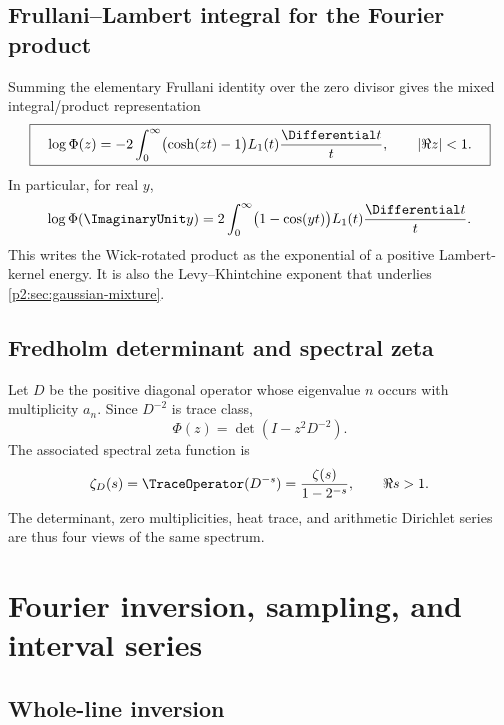 \documentclass[11pt]{article}
\theoremstyle{definition}
\theoremstyle{remark}
\begin{document}
\subsection{Frullani--Lambert integral for the Fourier product}

Summing the elementary Frullani identity over the zero divisor gives the mixed
integral/product representation
\begin{equation}
 \boxed{\quad
 \log\Phi(z)
 =-2\int_0^\infty\bigl(\cosh(zt)-1\bigr)L_1(t)\frac{\Differential t}{t},
 \qquad |\Re z|<1.
 \quad}                                                  \label{p2:eq:Frullani-Phi}
\end{equation}
In particular, for real $y$,
\begin{equation}
 \log\Phi(\ImaginaryUnit y)
 =2\int_0^\infty\bigl(1-\cos(yt)\bigr)L_1(t)\frac{\Differential t}{t}.  \label{p2:eq:Phi-imag-integral}
\end{equation}
This writes the Wick-rotated product as the exponential of a positive Lambert-kernel energy.
It is also the Levy--Khintchine exponent that underlies \cref{p2:sec:gaussian-mixture}.

\subsection{Fredholm determinant and spectral zeta}

Let $D$ be the positive diagonal operator whose eigenvalue $n$ occurs with multiplicity
$a_n$.  Since $D^{-2}$ is trace class,
\begin{equation}
 \boxed{\quad
 \Phi(z)=\det(I-z^2D^{-2}).
 \quad}                                                  \label{p2:eq:Fredholm}
\end{equation}
The associated spectral zeta function is
\begin{equation}
 \zeta_D(s)=\TraceOperator(D^{-s})
 =\frac{\zeta(s)}{1-2^{-s}},\qquad \Re s>1.              \label{p2:eq:spectral-zeta}
\end{equation}
The determinant, zero multiplicities, heat trace, and arithmetic Dirichlet series are thus
four views of the same spectrum.

\section{Fourier inversion, sampling, and interval series}
\label{p2:sec:fourier-inversion}

\subsection{Whole-line inversion}
\end{document}
